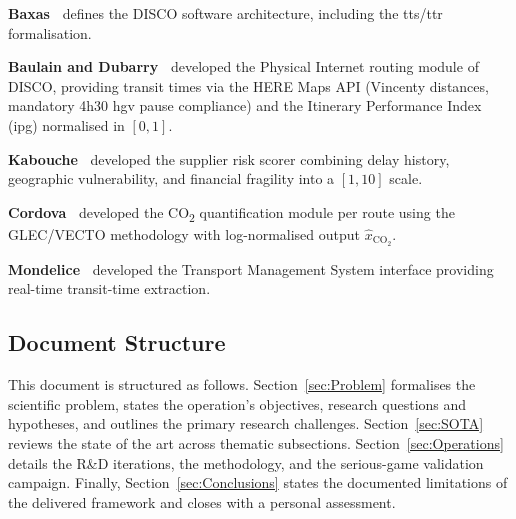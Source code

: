 \textbf{Baxas~\autocite{baxas2025architecture}} defines the DISCO software
architecture, including the \gls{tts}/\gls{ttr} formalisation.

\textbf{Baulain and Dubarry~\autocite{baulain2024internet}} developed the Physical
Internet routing module of DISCO, providing transit times via the HERE Maps API
(Vincenty distances, mandatory 4h30 \gls{hgv} pause compliance) and the Itinerary
Performance Index (\gls{ipg}) normalised in $[0,1]$.

\textbf{Kabouche~\autocite{kabouche2025scoring}} developed the supplier risk scorer
combining delay history, geographic vulnerability, and financial fragility into a
$[1, 10]$ scale.

\textbf{Cordova~\autocite{cordova2024green}} developed the CO\textsubscript{2}
quantification module per route using the GLEC/VECTO methodology with log-normalised
output $\hat{x}_{\text{CO}_2}$.

\textbf{Mondelice~\autocite{mondelice2025tms}} developed the Transport Management
System interface providing real-time transit-time extraction.


\subsection{Document Structure}

This document is structured as follows. Section~\ref{sec:Problem} formalises the scientific problem, states the operation's objectives, research questions and hypotheses, and outlines the primary research challenges. Section~\ref{sec:SOTA} reviews the state of the art across thematic subsections. Section~\ref{sec:Operations} details the R\&D iterations, the methodology, and the serious-game validation campaign. Finally, Section~\ref{sec:Conclusions} states the documented limitations of the delivered framework and closes with a personal assessment.
